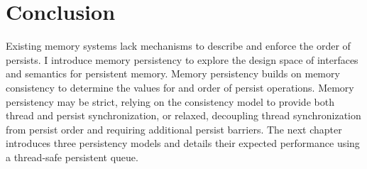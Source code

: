 \section{Conclusion}
\label{sec:Persistency:Conclusion}

Existing memory systems lack mechanisms to describe and enforce the order of persists.
I introduce memory persistency to explore the design space of interfaces and semantics for persistent memory.
Memory persistency builds on memory consistency to determine the values for and order of persist operations.
Memory persistency may be strict, relying on the consistency model to provide both thread and persist synchronization, or relaxed, decoupling thread synchronization from persist order and requiring additional persist barriers.
The next chapter introduces three persistency models and details their expected performance using a thread-safe persistent queue.
